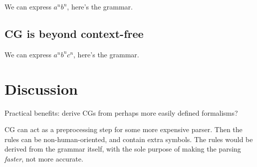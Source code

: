 \documentclass[11pt]{article}
\begin{document}
We can express $a^nb^n$, here's the grammar.

\subsection{CG is beyond context-free}

We can express $a^nb^nc^n$, here's the grammar.  

\section{Discussion}

Practical benefits: derive CGs from perhaps more easily defined formalisms?

CG can act as a preprocessing step for some more expensive parser. Then the rules can be non-human-oriented, and contain extra symbols. The rules would be derived from the grammar itself, with the sole purpose of making the parsing \emph{faster}, not more accurate.









\end{document}
